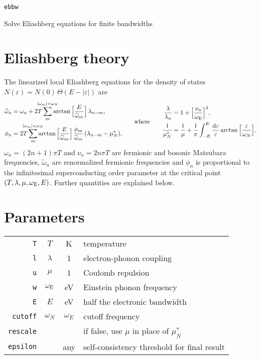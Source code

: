 \documentclass[a4paper]{article}
\def\D{\mathrm d}
\def\sub#1{\sb{\mathrm{#1}}}
\def\limit#1{\sp{\mathclap{#1}}}
\let\tilde\widetilde
\let\epsilon\varepsilon
\let\Theta\varTheta
\def\headline#1{\section*{\normalsize\normalfont%
   \rlap{\rule[0.5ex]{\textwidth}{0.4pt}}\qquad\colorbox{white}{#1}}}
\begin{document}
   \begin{center}
      \LARGE \texttt{ebbw} \par \bigskip
      \large Solve Eliashberg equations for finite bandwidths
   \end{center}

   \headline{Eliashberg theory}

   The linearized local Eliashberg equations for the density of states
   $N(\epsilon) = N(0) \, \Theta(E - |\epsilon|)$ are
   \begin{align*}
      \begin{aligned}
         \tilde \omega_n &= \omega_n + 2 T \sum_m \limit{|\omega_m| < \omega_N}
         \arctan \Big[ \frac E {\tilde \omega_m} \Big] \, \lambda_{n - m},
         \\
         \phi_n &= 2 T \sum_m \limit{|\omega_m| < \omega_N}
         \arctan \Big[ \frac E {\tilde \omega_m} \Big] \,
         \frac{\phi_m}{\tilde \omega_m} \, (\lambda_{n - m} - \mu^*_N),
      \end{aligned}
      \qquad \text{where} \qquad
      \begin{aligned}
         \frac \lambda {\lambda_n} &=
         1 + \Big[ \frac{\nu_n}{\omega \sub E} \Big]^2,
         \\
         \frac 1 {\mu^*_N} &=
         \frac 1 \mu + \frac 1 \pi \int_{-E}^E \frac {\D \epsilon} \epsilon
         \arctan \Big[ \frac \epsilon {\omega_N} \Big].
      \end{aligned}
   \end{align*}
   $\omega_n = (2 n + 1) \pi T$ and $\nu_n = 2 n \pi T$ are fermionic and
   bosonic Matsubara frequencies, $\tilde \omega_n$ are renormalized fermionic
   frequencies and $\phi_n$ is proportional to the infinitesimal superconducting
   order parameter at the critical point $(T, \lambda, \mu, \omega \sub E, E)$.
   Further quantities are explained below.

   \headline{Parameters}

   \begin{center}
      \begin{tabular}{r c c l}
         \verb|T| & $T$ & K & temperature \\
         \verb|l| & $\lambda$ & 1 & electron-phonon coupling \\
         \verb|u| & $\mu$ & 1 & Coulomb repulsion \\
         \verb|w| & $\omega \sub E$ & eV & Einstein phonon frequency \\
         \verb|E| & $E$ & eV & half the electronic bandwidth \\
         [2mm]
         \verb|cutoff| & $\omega_N$ & $\omega_E$ & cutoff frequency \\
         \verb|rescale| & & & if false, use $\mu$ in place of $\mu^*_N$ \\
         \verb|epsilon| & & any & self-consistency threshold for final result
      \end{tabular}
   \end{center}
\end{document}
